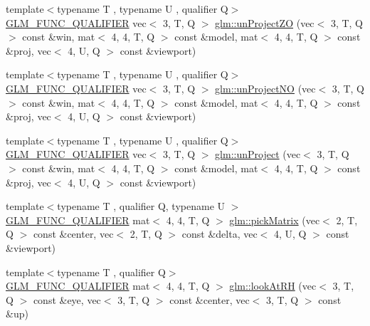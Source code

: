 \begin{DoxyCompactItemize}
\item 
{\footnotesize template$<$typename T , typename U , qualifier Q$>$ }\\\hyperlink{setup_8hpp_a33fdea6f91c5f834105f7415e2a64407}{G\+L\+M\+\_\+\+F\+U\+N\+C\+\_\+\+Q\+U\+A\+L\+I\+F\+I\+ER} vec$<$ 3, T, Q $>$ \hyperlink{group__gtc__matrix__transform_gade5136413ce530f8e606124d570fba32}{glm\+::un\+Project\+ZO} (vec$<$ 3, T, Q $>$ const \&win, mat$<$ 4, 4, T, Q $>$ const \&model, mat$<$ 4, 4, T, Q $>$ const \&proj, vec$<$ 4, U, Q $>$ const \&viewport)
\item 
{\footnotesize template$<$typename T , typename U , qualifier Q$>$ }\\\hyperlink{setup_8hpp_a33fdea6f91c5f834105f7415e2a64407}{G\+L\+M\+\_\+\+F\+U\+N\+C\+\_\+\+Q\+U\+A\+L\+I\+F\+I\+ER} vec$<$ 3, T, Q $>$ \hyperlink{group__gtc__matrix__transform_gae089ba9fc150ff69c252a20e508857b5}{glm\+::un\+Project\+NO} (vec$<$ 3, T, Q $>$ const \&win, mat$<$ 4, 4, T, Q $>$ const \&model, mat$<$ 4, 4, T, Q $>$ const \&proj, vec$<$ 4, U, Q $>$ const \&viewport)
\item 
{\footnotesize template$<$typename T , typename U , qualifier Q$>$ }\\\hyperlink{setup_8hpp_a33fdea6f91c5f834105f7415e2a64407}{G\+L\+M\+\_\+\+F\+U\+N\+C\+\_\+\+Q\+U\+A\+L\+I\+F\+I\+ER} vec$<$ 3, T, Q $>$ \hyperlink{group__gtc__matrix__transform_ga36641e5d60f994e01c3d8f56b10263d2}{glm\+::un\+Project} (vec$<$ 3, T, Q $>$ const \&win, mat$<$ 4, 4, T, Q $>$ const \&model, mat$<$ 4, 4, T, Q $>$ const \&proj, vec$<$ 4, U, Q $>$ const \&viewport)
\item 
{\footnotesize template$<$typename T , qualifier Q, typename U $>$ }\\\hyperlink{setup_8hpp_a33fdea6f91c5f834105f7415e2a64407}{G\+L\+M\+\_\+\+F\+U\+N\+C\+\_\+\+Q\+U\+A\+L\+I\+F\+I\+ER} mat$<$ 4, 4, T, Q $>$ \hyperlink{group__gtc__matrix__transform_gaf6b21eadb7ac2ecbbe258a9a233b4c82}{glm\+::pick\+Matrix} (vec$<$ 2, T, Q $>$ const \&center, vec$<$ 2, T, Q $>$ const \&delta, vec$<$ 4, U, Q $>$ const \&viewport)
\item 
{\footnotesize template$<$typename T , qualifier Q$>$ }\\\hyperlink{setup_8hpp_a33fdea6f91c5f834105f7415e2a64407}{G\+L\+M\+\_\+\+F\+U\+N\+C\+\_\+\+Q\+U\+A\+L\+I\+F\+I\+ER} mat$<$ 4, 4, T, Q $>$ \hyperlink{group__gtc__matrix__transform_gacfa12c8889c754846bc20c65d9b5c701}{glm\+::look\+At\+RH} (vec$<$ 3, T, Q $>$ const \&eye, vec$<$ 3, T, Q $>$ const \&center, vec$<$ 3, T, Q $>$ const \&up)
\item 

\end{DoxyCompactItemize}
